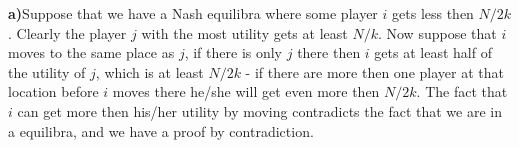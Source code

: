 \textbf{a)}Suppose that we have a Nash equilibra where some player $i$ gets less then $N/2k$. Clearly the player $j$ with the most utility gets at least $N/k$. Now suppose that $i$ moves to the same place as $j$, if there is only $j$ there then $i$ gets at least half of the utility of $j$, which is at least $N/2k$ - if there are more then one player at that location before $i$ moves there he/she will get even more then $N/2k$. The fact that $i$ can get more then his/her utility by moving contradicts the fact that we are in a equilibra, and we have a proof by contradiction. 



